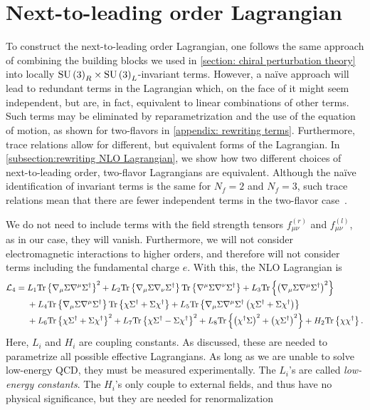 \section{Next-to-leading order Lagrangian}
\label{section: nlo chpt}


To construct the next-to-leading order Lagrangian, one follows the same approach of combining the building blocks we used in \autoref{section: chiral perturbation theory} into locally $\text{SU}\left(3\right)_R\times\text{SU}\left(3\right)_L$-invariant terms.
However, a naïve approach will lead to redundant terms in the Lagrangian which, on the face of it might seem independent, but are, in fact, equivalent to linear combinations of other terms.
Such terms may be eliminated by reparametrization and the use of the equation of motion, as shown for two-flavors in \autoref{appendix: rewriting terms}.
Furthermore, trace relations allow for different, but equivalent forms of the Lagrangian.
In \autoref{subsection:rewriting NLO Lagrangian}, we show how two different choices of next-to-leading order, two-flavor Lagrangians are equivalent.
Although the naïve identification of invariant terms is the same for $N_f = 2$ and $N_f=3$, such trace relations mean that there are fewer independent terms in the two-flavor case~\autocite{schererIntroductionChiralPerturbation2002}.

We do not need to include terms with the field strength tensors $f_{\mu\nu}^{(r)}$ and $f_{\mu\nu}^{(l)}$, as in our case, they will vanish.
Furthermore, we will not consider electromagnetic interactions to higher orders, and therefore will not consider terms including the fundamental charge $e$.
With this, the NLO Lagrangian is~\autocite{gasserChiralPerturbationTheory1985}
%
\begin{align}
    \label{NLO Lagrangian three flavor}
    \nonumber
    \mathcal{L}_4 
    ={} &
    L_1\text{Tr} \left\{ \nabla_\mu \Sigma \nabla^\mu \Sigma^\dagger \right\}^2
    + L_2 \text{Tr} \left\{ \nabla_\mu \Sigma \nabla_\nu \Sigma^\dagger \right\} 
    \text{Tr} \left\{ \nabla^\mu \Sigma \nabla^\nu \Sigma^\dagger \right\}
    + L_3 \text{Tr} \left\{ \left(\nabla_\mu \Sigma \nabla^\mu \Sigma^\dagger\right)^2 \right\} \\ \nonumber
    & + L_4 \text{Tr} \left\{ \nabla_\mu \Sigma \nabla^\mu \Sigma^\dagger \right\} 
    \text{Tr} \left\{ \chi \Sigma^\dagger + \Sigma \chi^\dagger \right\}
    + L_5 \text{Tr} \left\{ 
        \nabla_\mu \Sigma \nabla^\mu \Sigma^\dagger 
        \left(\chi \Sigma^\dagger + \Sigma \chi^\dagger\right)
     \right\}\\
    &+ L_6 \text{Tr} \left\{ \chi \Sigma^\dagger + \Sigma \chi^\dagger \right\}^2 
     + L_7 \text{Tr} \left\{ \chi \Sigma^\dagger - \Sigma \chi^\dagger \right\}^2
    + L_8 \text{Tr} \left\{  \left(\chi^\dagger \Sigma \right)^2 + \left(\chi \Sigma^\dagger \right)^2 \right\}
    + H_2 \text{Tr} \left\{ \chi \chi^\dagger \right\}.
\end{align}
%
Here, $L_i$ and $H_i$ are coupling constants.
As discussed, these are needed to parametrize all possible effective Lagrangians.
As long as we are unable to solve low-energy QCD, they must be measured experimentally.
The $L_i$'s are called \emph{low-energy constants}.
The $H_i$'s only couple to external fields, and thus have no physical significance, but they are needed for renormalization~\autocite{gasserChiralPerturbationTheory1985}

